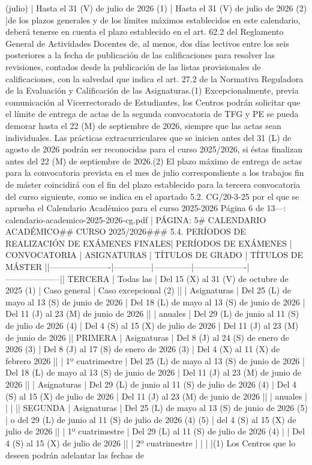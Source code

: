 \documentclass{article}
\begin{document}
\begin{itemize}
{(julio) | Hasta el 31 (V) de julio de 2026 (1)       | Hasta el 31 (V) de julio de 2026 (2)          |\n\nDentro de los plazos generales y de los límites máximos establecidos en este calendario, deberá tenerse en cuenta el plazo establecido en el art. 62.2 del Reglamento General de Actividades Docentes de, al menos, dos días lectivos entre los seis posteriores a la fecha de publicación de las calificaciones para resolver las revisiones, contados desde la publicación de las listas provisionales de calificaciones, con la salvedad que indica el art. 27.2 de la Normativa Reguladora de la Evaluación y Calificación de las Asignaturas.\n\n(1) Excepcionalmente, previa comunicación al Vicerrectorado de Estudiantes, los Centros podrán solicitar que el límite de entrega de actas de la segunda convocatoria de TFG y PE se pueda demorar hasta el 22 (M) de septiembre de 2026, siempre que las actas sean individuales. Las prácticas extracurriculares que se inicien antes del 31 (L) de agosto de 2026 podrán ser reconocidas para el curso 2025/2026, si éstas finalizan antes del 22 (M) de septiembre de 2026.\n\n(2) El plazo máximo de entrega de actas para la convocatoria prevista en el mes de julio correspondiente a los trabajos fin de máster coincidirá con el fin del plazo establecido para la tercera convocatoria del curso siguiente, como se indica en el apartado 5.2.\n{} CG/20-3-25 por el que se aprueba el Calendario Académico para el curso 2025-2026  Página 6 de 13\n\n---\n\nFUENTE: calendario-academico-2025-2026-cg.pdf | PÁGINA: 5\n# CALENDARIO ACADÉMICO\n## CURSO 2025/2026\n\n### 5.4. PERÍODOS DE REALIZACIÓN DE EXÁMENES FINALES\n\n| PERÍODOS DE EXÁMENES | CONVOCATORIA | ASIGNATURAS | TÍTULOS DE GRADO | TÍTULOS DE MÁSTER |\n|----------------------|--------------|--------------|-------------------|--------------------|\n| TERCERA              | Todas las    | Del 15 (X) al 31 (V) de octubre de 2025 (1) | Caso general | Caso excepcional (2) |\n|                      | Asignaturas  | Del 25 (L) de mayo al 13 (S) de junio de 2026 | Del 18 (L) de mayo al 13 (S) de junio de 2026 | Del 11 (J) al 23 (M) de junio de 2026 |\n|                      | anuales      | Del 29 (L) de junio al 11 (S) de julio de 2026 (4) | Del 4 (S) al 15 (X) de julio de 2026 | Del 11 (J) al 23 (M) de junio de 2026 |\n| PRIMERA              | Asignaturas  | Del 8 (J) al 24 (S) de enero de 2026 (3) | Del 8 (J) al 17 (S) de enero de 2026 (3) | Del 4 (X) al 11 (X) de febrero 2026 |\n|                      | 1º cuatrimestre | Del 25 (L) de mayo al 13 (S) de junio de 2026 | Del 18 (L) de mayo al 13 (S) de junio de 2026 | Del 11 (J) al 23 (M) de junio de 2026 |\n|                      | Asignaturas  | Del 29 (L) de junio al 11 (S) de julio de 2026 (4) | Del 4 (S) al 15 (X) de julio de 2026 | Del 11 (J) al 23 (M) de junio de 2026 |\n|                      | anuales      | | | |\n| SEGUNDA              | Asignaturas  | Del 25 (L) de mayo al 13 (S) de junio de 2026 (5) | o del 29 (L) de junio al 11 (S) de julio de 2026 (4) (5) | del 4 (S) al 15 (X) de julio de 2026 |\n|                      | 1º cuatrimestre | Del 29 (L) al 11 (S) de julio de 2026 (4) | | Del 4 (S) al 15 (X) de julio de 2026 |\n|                      | 2º cuatrimestre | | | |\n\n(1) Los Centros que lo deseen podrán adelantar las fechas de }
\end{itemize}
\end{document}
